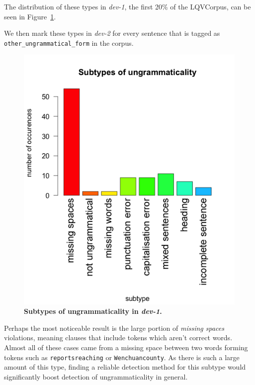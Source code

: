 \documentclass[a4paper,10pt]{scrartcl}
\begin{document}
The distribution of these types in \textit{dev-1}, the first 20\% of the LQVCorpus, can be seen in Figure~\ref{subtypes}.

We then mark these types in \textit{dev-2} for every sentence that is tagged as \texttt{other\_ungrammatical\_form} in the corpus.

\begin{figure}
\begin{center}
\includegraphics[scale=0.6]{subtypesWithText2.png}
\end{center}
\caption{\textbf{Subtypes of ungrammaticality in \textit{dev-1}.}}%
\label{subtypes}
\end{figure}

Perhaps the most noticeable result is the large portion of \textit{missing spaces} violations, meaning clauses that include tokens which aren't correct words. Almost all of these cases came from a missing space between two words forming tokens such as \texttt{reportsreaching} or \texttt{Wenchuancounty}. As there is such a large amount of this type, finding a reliable detection method for this subtype would significantly boost detection of ungrammaticality in general.
\end{document}
